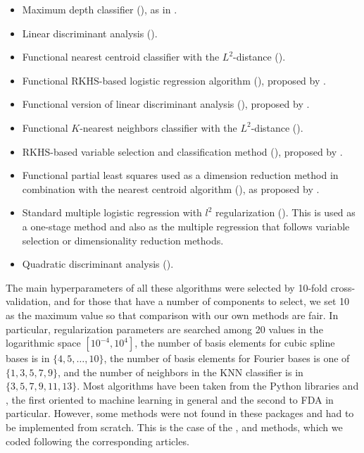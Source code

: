 \begin{itemize}
  \item Maximum depth classifier (), as in \citet{ghosh2005maximum}.
  \item Linear discriminant analysis ().
  \item Functional nearest centroid classifier with the \(L^2\)-distance ().
  \item Functional \acs{RKHS}-based logistic regression algorithm (), proposed by \citet{berrendero2023functional}.
  \item Functional version of linear discriminant analysis (), proposed by \citet{preda2007pls}.
  \item Functional \(K\)-nearest neighbors classifier with the \(L^2\)-distance ().
  \item \acs{RKHS}-based variable selection and classification method (), proposed by \citet{berrendero2018use}.
  \item Functional partial least squares used as a dimension reduction method in combination with the nearest centroid algorithm (), as proposed by \citet{delaigle2012achieving}.
  \item Standard multiple logistic regression with \(l^2\) regularization (). This is used as a one-stage method and also as the multiple regression that follows variable selection or dimensionality reduction methods.
  \item Quadratic discriminant analysis ().
\end{itemize}

The main hyperparameters of all these algorithms were selected by 10-fold cross-validation, and for those that have a number of components to select, we set 10 as the maximum value so that comparison with our own methods are fair. In particular, regularization parameters are searched among 20 values in the logarithmic space \([10^{-4}, 10^4]\), the number of basis elements for cubic spline bases is in \(\{4,5,\dots,10\}\), the number of basis elements for Fourier bases is one of \(\{1,3,5,7,9\}\), and the number of neighbors in the KNN classifier is in \(\{3,5,7,9,11,13\}\). Most algorithms have been taken from the Python libraries  \citep{pedregosa2011scikit} and  \citep{ramos2024scikit}, the first oriented to machine learning in general and the second to \acs{FDA} in particular. However, some methods were not found in these packages and had to be implemented from scratch. This is the case of the ,  and  methods, which we coded following the corresponding articles.

